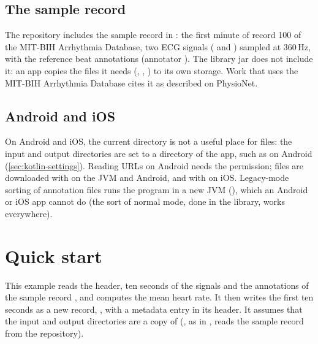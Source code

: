 \subsection{The sample record}
\label{sec:kotlin-resources}

The repository includes the sample record  in : the first
minute of record 100 of the MIT-BIH Arrhythmia Database, two ECG signals ( and
) sampled at 360\,Hz, with the reference beat annotations (annotator
). The library jar does not include it: an app copies the files it needs
(, , ) to its own storage. Work that uses the
MIT-BIH Arrhythmia Database cites it as described on PhysioNet.

\subsection{Android and iOS}

On Android and iOS, the current directory is not a useful place for files: the input and
output directories are set to a directory of the app, such as
 on Android (\cref{sec:kotlin-settings}). Reading URLs on
Android needs the  permission; files are downloaded with
 on the JVM and Android, and with  on
iOS. Legacy-mode sorting of annotation files runs the  program in a new JVM
(), which an Android or iOS app cannot do (the sort of normal mode,
done in the library, works everywhere).

\section{Quick start}
\label{sec:kotlin-quickstart}

This example reads the header, ten seconds of the signals and the annotations of the
sample record , and computes the mean heart rate. It then writes the first ten
seconds as a new record, , with a metadata entry in its header. It assumes
that the input and output directories are a copy of 
(, as in , reads the sample
record from the repository).


